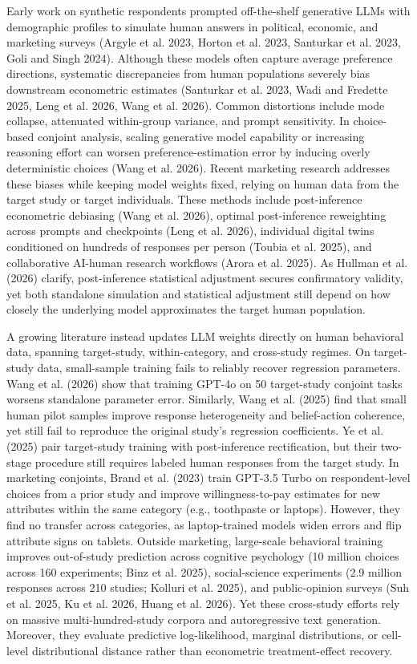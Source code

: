 \documentclass[
  11pt,
  letterpaper,
]{article}
\begin{document}
Early work on synthetic respondents prompted off-the-shelf generative
LLMs with demographic profiles to simulate human answers in political,
economic, and marketing surveys (Argyle et al. 2023, Horton et al. 2023,
Santurkar et al. 2023, Goli and Singh 2024). Although these models often
capture average preference directions, systematic discrepancies from
human populations severely bias downstream econometric estimates
(Santurkar et al. 2023, Wadi and Fredette 2025, Leng et al. 2026, Wang
et al. 2026). Common distortions include mode collapse, attenuated
within-group variance, and prompt sensitivity. In choice-based conjoint
analysis, scaling generative model capability or increasing reasoning
effort can worsen preference-estimation error by inducing overly
deterministic choices (Wang et al. 2026). Recent marketing research
addresses these biases while keeping model weights fixed, relying on
human data from the target study or target individuals. These methods
include post-inference econometric debiasing (Wang et al. 2026), optimal
post-inference reweighting across prompts and checkpoints (Leng et al.
2026), individual digital twins conditioned on hundreds of responses per
person (Toubia et al. 2025), and collaborative AI-human research
workflows (Arora et al. 2025). As Hullman et al. (2026) clarify,
post-inference statistical adjustment secures confirmatory validity, yet
both standalone simulation and statistical adjustment still depend on
how closely the underlying model approximates the target human
population.

A growing literature instead updates LLM weights directly on human
behavioral data, spanning target-study, within-category, and cross-study
regimes. On target-study data, small-sample training fails to reliably
recover regression parameters. Wang et al. (2026) show that training
GPT-4o on 50 target-study conjoint tasks worsens standalone parameter
error. Similarly, Wang et al. (2025) find that small human pilot samples
improve response heterogeneity and belief-action coherence, yet still
fail to reproduce the original study's regression coefficients. Ye et
al. (2025) pair target-study training with post-inference rectification,
but their two-stage procedure still requires labeled human responses
from the target study. In marketing conjoints, Brand et al. (2023) train
GPT-3.5 Turbo on respondent-level choices from a prior study and improve
willingness-to-pay estimates for new attributes within the same category
(e.g., toothpaste or laptops). However, they find no transfer across
categories, as laptop-trained models widen errors and flip attribute
signs on tablets. Outside marketing, large-scale behavioral training
improves out-of-study prediction across cognitive psychology (10 million
choices across 160 experiments; {Binz et al.} 2025), social-science
experiments (2.9 million responses across 210 studies; Kolluri et al.
2025), and public-opinion surveys (Suh et al. 2025, Ku et al. 2026,
Huang et al. 2026). Yet these cross-study efforts rely on massive
multi-hundred-study corpora and autoregressive text generation.
Moreover, they evaluate predictive log-likelihood, marginal
distributions, or cell-level distributional distance rather than
econometric treatment-effect recovery.
\end{document}
